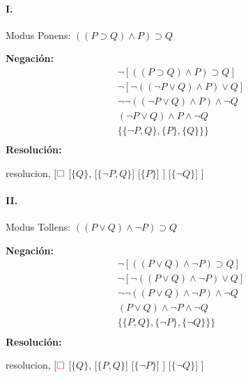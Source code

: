 \documentclass[10pt,a4paper]{article}
\begin{document}
\paragraph{I.} Modus Ponens: $((P \supset Q) \land P) \supset Q$
\begin{multicols}{2}
\textbf{Negación:}
\begin{align*}
\lnot[((P \supset Q) \land P) \supset Q] \\[1pt]
\lnot[\lnot((\lnot P \lor Q) \land P) \lor Q] \\[1pt]
\lnot\lnot((\lnot P \lor Q) \land P) \land \lnot Q \\[1pt]
(\lnot P \lor Q) \land P \land \lnot Q \\[1pt]
\{\{\lnot P, Q\}, \{P\}, \{Q\}\}\} \\[1pt]
\end{align*}
\textbf{Resolución:}
\begin{center}
	\begin{forest} resolucion,
[${\color{red}\Box}$ 
	[$\{ Q \}$,
    	[$\{\lnot P\comma Q\}$]
    	[$\{P\}$]
	]
	[$\{ \lnot Q \}$]
]
	\end{forest}
\end{center}
\end{multicols}

\newpage
\paragraph{II.} Modus Tollens: $((P \lor Q) \land \lnot P) \supset Q$
\begin{multicols}{2}
\textbf{Negación:}
\begin{align*}
\lnot[((P \lor Q) \land \lnot P) \supset Q] \\[1pt]
\lnot[\lnot((P \lor Q) \land \lnot P) \lor Q] \\[1pt] \lnot\lnot((P \lor Q) \land \lnot P) \land \lnot Q \\[1pt]
(P \lor Q) \land \lnot P \land \lnot Q \\[1pt]
\{\{P, Q\}, \{\lnot P\}, \{\lnot Q\}\}\} \\[1pt]
\end{align*}
\textbf{Resolución:}
\begin{center}
	\begin{forest} resolucion,
[${\color{red}\Box}$ 
	[$\{ Q \}$,
    	[$\{ P\comma Q\}$]
    	[$\{\lnot P\}$]
	]
	[$\{ \lnot Q \}$]
]
	\end{forest}
\end{center}
\end{multicols}
\end{document}
